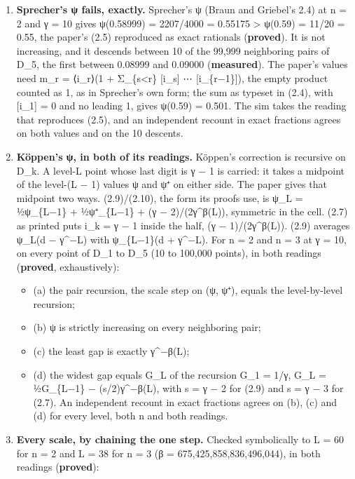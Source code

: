 \begin{enumerate}
\item \textbf{Sprecher's ψ fails, exactly.} Sprecher's ψ (Braun and Griebel's 2.4) at n = 2 and γ = 10 gives ψ(0.58999) = 2207/4000 = 0.55175 > ψ(0.59) = 11/20 = 0.55, the paper's (2.5) reproduced as exact rationals (\textbf{proved}). It is not increasing, and it descends between 10 of the 99,999 neighboring pairs of D\_\allowbreak{}5, the first between 0.08999 and 0.09000 (\textbf{measured}). The paper's values need m\_\allowbreak{}r = ⟨i\_\allowbreak{}r⟩(1 + Σ\_\allowbreak{}\{s<r\} [i\_\allowbreak{}s] ⋯ [i\_\allowbreak{}\{r−1\}]), the empty product counted as 1, as in Sprecher's own form; the sum as typeset in (2.4), with [i\_\allowbreak{}1] = 0 and no leading 1, gives ψ(0.59) = 0.501. The sim takes the reading that reproduces (2.5), and an independent recount in exact fractions agrees on both values and on the 10 descents.
\item \textbf{Köppen's ψ, in both of its readings.} Köppen's correction is recursive on D\_\allowbreak{}k. A level-L point whose last digit is γ − 1 is carried: it takes a midpoint of the level-(L − 1) values ψ and ψ⁺ on either side. The paper gives that midpoint two ways. (2.9)/(2.10), the form its proofs use, is ψ\_\allowbreak{}L = ½ψ\_\allowbreak{}\{L−1\} + ½ψ⁺\_\allowbreak{}\{L−1\} + (γ − 2)/(2γ\textasciicircum{}β(L)), symmetric in the cell. (2.7) as printed puts i\_\allowbreak{}k = γ − 1 inside the half, (γ − 1)/(2γ\textasciicircum{}β(L)). (2.9) averages ψ\_\allowbreak{}L(d − γ\textasciicircum{}−L) with ψ\_\allowbreak{}\{L−1\}(d + γ\textasciicircum{}−L). For n = 2 and n = 3 at γ = 10, on every point of D\_\allowbreak{}1 to D\_\allowbreak{}5 (10 to 100,000 points), in both readings (\textbf{proved}, exhaustively):

\begin{itemize}
\item (a) the pair recursion, the scale step on (ψ, ψ⁺), equals the level-by-level recursion;
\item (b) ψ is strictly increasing on every neighboring pair;
\item (c) the least gap is exactly γ\textasciicircum{}−β(L);
\item (d) the widest gap equals G\_\allowbreak{}L of the recursion G\_\allowbreak{}1 = 1/γ, G\_\allowbreak{}L = ½G\_\allowbreak{}\{L−1\} − (s/2)γ\textasciicircum{}−β(L), with s = γ − 2 for (2.9) and s = γ − 3 for (2.7). An independent recount in exact fractions agrees on (b), (c) and (d) for every level, both n and both readings.
\end{itemize}
\item \textbf{Every scale, by chaining the one step.} Checked symbolically to L = 60 for n = 2 and L = 38 for n = 3 (β = 675,425,858,836,496,044), in both readings (\textbf{proved}):


\end{enumerate}
